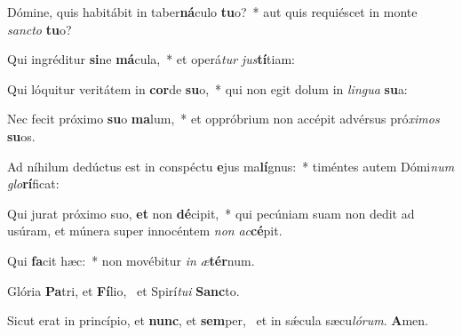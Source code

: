 \item Dómine, quis habitábit in taber\textbf{ná}culo \textbf{tu}o?~* aut quis requiéscet in monte \textit{sanc}\textit{to} \textbf{tu}o?
\item Qui ingréditur \textbf{si}ne \textbf{má}cula,~* et operá\textit{tur} \textit{jus}\textbf{tí}tiam:
\item Qui lóquitur veritátem in \textbf{cor}de \textbf{su}o,~* qui non egit dolum in \textit{lin}\textit{gua} \textbf{su}a:
\item Nec fecit próximo \textbf{su}o \textbf{ma}lum,~* et oppróbrium non accépit advérsus pró\textit{xi}\textit{mos} \textbf{su}os.
\item Ad níhilum dedúctus est in conspéctu \textbf{e}jus ma\textbf{lí}gnus:~* timéntes autem Dómi\textit{num} \textit{glo}\textbf{rí}ficat:
\item Qui jurat próximo suo, \textbf{et} non \textbf{dé}cipit,~* qui pecúniam suam non dedit ad usúram, et múnera super innocéntem \textit{non} \textit{ac}\textbf{cé}pit.
\item Qui \textbf{fa}cit hæc:~* non movébitur \textit{in} \textit{æ}\textbf{tér}num.
\item Glória \textbf{Pa}tri, et \textbf{Fí}lio,~\psstar{} et Spirí\textit{tu}\textit{i} \textbf{Sanc}to.
\item Sicut erat in princípio, et \textbf{nunc}, et \textbf{sem}per,~\psstar{} et in sǽcula sæcu\textit{ló}\textit{rum}. \textbf{A}men.